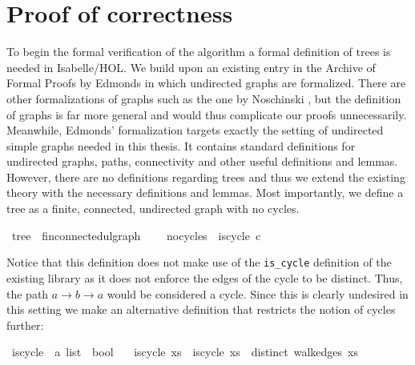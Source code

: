 \section{Proof of correctness}\label{section:labeled_tree_enum_correct}

To begin the formal verification of the algorithm a formal definition of trees is needed in Isabelle/HOL.
We build upon an existing entry in the Archive of Formal Proofs by Edmonds \cite{Undirected_Graph_Theory-AFP} in which undirected graphs are formalized.
There are other formalizations of graphs such as the one by Noschinski \cite{Graph_Theory-AFP}, but the definition of graphs is far more general and would thus complicate our proofs unnecessarily.
Meanwhile, Edmonds' formalization targets exactly the setting of undirected simple graphs needed in this thesis.
It contains standard definitions for undirected graphs, paths, connectivity and other useful definitions and lemmas.
However, there are no definitions regarding trees and thus we extend the existing theory with the necessary definitions and lemmas.
Most importantly, we define a tree as a finite, connected, undirected graph with no cycles.

\begin{isabellebox}
    \isamarkupfalse%
    \ tree\ {\isacharequal}{\kern0pt}\ fin{\isacharunderscore}{\kern0pt}connected{\isacharunderscore}{\kern0pt}ulgraph\ {\isacharplus}{\kern0pt}\isanewline
    \ \ \ no{\isacharunderscore}{\kern0pt}cycles{\isacharcolon}{\kern0pt}\ {\isachardoublequoteopen}{\isasymnot}\ is{\isacharunderscore}{\kern0pt}cycle{}\ c{\isachardoublequoteclose}
\end{isabellebox}

Notice that this definition does not make use of the \texttt{is\_cycle} definition of the existing library as it does not enforce the edges of the cycle to be distinct.
Thus, the path $a\rightarrow b\rightarrow a$ would be considered a cycle.
Since this is clearly undesired in this setting we make an alternative definition that restricts the notion of cycles further:

\begin{isabellebox}
    \isamarkupfalse%
    \ is{\isacharunderscore}{\kern0pt}cycle{}\ {\isacharcolon}{\kern0pt}{\isacharcolon}{\kern0pt}\ {\isachardoublequoteopen}{\isacharprime}{\kern0pt}a\ list\ {\isasymRightarrow}\ bool{\isachardoublequoteclose}\ \isanewline
    \ \ {\isachardoublequoteopen}is{\isacharunderscore}{\kern0pt}cycle{}\ xs\ {\isasymlongleftrightarrow}\ is{\isacharunderscore}{\kern0pt}cycle\ xs\ {\isasymand}\ distinct\ {\isacharparenleft}{\kern0pt}walk{\isacharunderscore}{\kern0pt}edges\ xs{\isacharparenright}{\kern0pt}{\isachardoublequoteclose}
\end{isabellebox}


